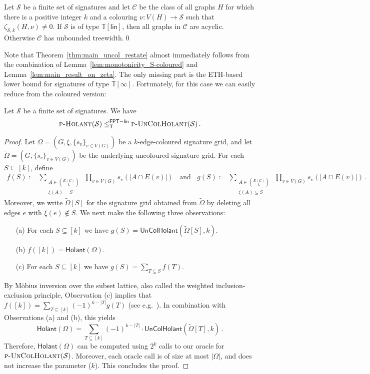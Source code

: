 \documentclass[authorcolumns,numberwithinsect]{no-lipics-v2022}
\newcommand{\fptlinred}{\leq^{\mathsf{FPT-lin}}_{\mathsf{T}}}
\newcommand{\holantprob}{\text{\sc{p-Holant}}}
\newcommand{\holant}{\mathsf{Holant}}
\begin{document}
\begin{lemma}\label{lem:main_result_on_zeta}
    Let $\mathcal{S}$ be a finite set of signatures and let $\mathcal{C}$ be the class of all graphs $H$ for which there is a positive integer $k$ and a colouring $\nu:V(H)\to \mathcal{S}$ such that $\zeta_{\mathcal{S},k}(H,\nu)\neq 0$. If $\mathcal{S}$ is of type $\mathbb{T}[\mathsf{lin}]$, then all graphs in $\mathcal{C}$ are acyclic. Otherwise $\mathcal{C}$ has unbounded treewidth.\qed
\end{lemma}

Note that Theorem~\ref{thm:main_uncol_restate} almost immediately follows from the combination of Lemma~\ref{lem:monotonicity_S-coloured} and Lemma~\ref{lem:main_result_on_zeta}. The only missing part is the ETH-based lower bound for signatures of type $\mathbb{T}[\infty]$. Fortunately, for this case we can easily reduce from the coloured version:

\begin{lemma}\label{lem:col_to_uncol}
    Let $\mathcal{S}$ be a finite set of signatures. We have 
    \[ \holantprob(\mathcal{S}) \fptlinred \text{\sc{p-UnColHolant}}(\mathcal{S})\,.\]
\end{lemma}
\begin{proof}
Let $\Omega=(G,\xi,\{s_v\}_{v\in V(G)})$ be a $k$-edge-coloured signature grid, and let $\tilde{\Omega}=(G,\{s_v\}_{v\in V(G)})$ be the underlying uncoloured signature grid.
For each $S\subseteq [k]$, define
\begin{align*}
f(S) := \sum_{\substack{A \in \binom{E(G)}{k}\\ \xi(A) = S}}~ \prod_{v\in V(G)} s_v(|A \cap E(v)|)  ~~~~\text{and}~~~~  g(S) := \sum_{\substack{A \in \binom{E(G)}{k}\\ \xi(A) \subseteq S}}~ \prod_{v\in V(G)} s_v(|A \cap E(v)|) \,. 
\end{align*} 
Moreover, we write $\tilde{\Omega}[S]$ for the signature grid obtained from $\tilde{\Omega}$ by deleting all edges $e$ with $\xi(e)\notin S$.
We next make the following three observations: 
\begin{enumerate}
    \item[(a)] For each $S\subseteq [k]$ we have $g(S)=\mathsf{UnColHolant}(\tilde{\Omega}[S],k)$.
    \item[(b)] $f([k]) = \holant(\Omega)$.
    \item[(c)] For each $S\subseteq [k]$ we have $g(S)=\sum_{T\subseteq S}f(T)$.
\end{enumerate}
By M\"obius inversion over the subset lattice, also called the weighted inclusion-exclusion principle, Observation (c) implies that $f([k]) = \sum_{T\subseteq [k]} (-1)^{k-|T|} g(T)$ (see e.g.\ \cite[Example 3.8.3]{Stanley11}). In combination with Observations (a) and (b), this yields
\[ \holant(\Omega) = \sum_{T\subseteq [k]} (-1)^{k-|T|} \cdot \mathsf{UnColHolant}(\tilde{\Omega}[T],k) \,.\]
Therefore, $\holant(\Omega)$ can be computed using $2^k$ calls to our oracle for $\textsc{p-UnColHolant}(\mathcal{S})$. Moreover, each oracle call is of size at most $|\Omega|$, and does not increase the parameter ($k$). This concludes the proof. 
\end{proof}
\end{document}
